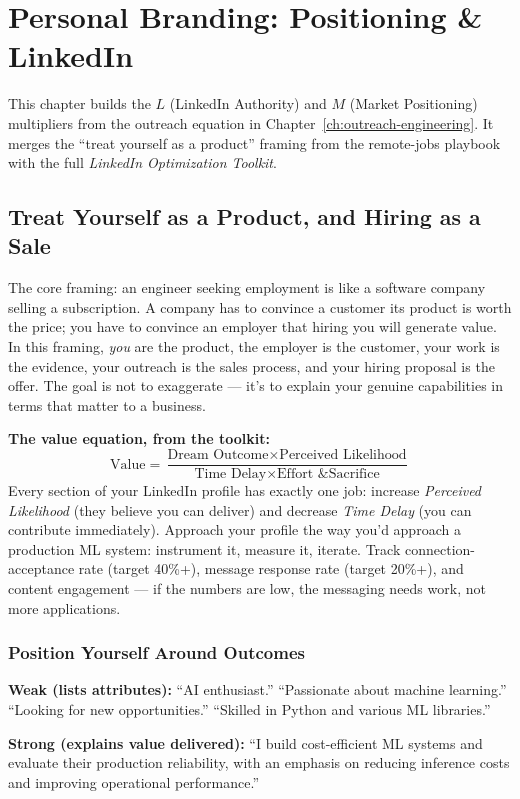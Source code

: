 \chapter{Personal Branding: Positioning \& LinkedIn}
\label{ch:linkedin}

This chapter builds the $L$ (LinkedIn Authority) and $M$ (Market Positioning) multipliers from the outreach
equation in Chapter~\ref{ch:outreach-engineering}. It merges the ``treat yourself as a product'' framing from the
remote-jobs playbook with the full \emph{LinkedIn Optimization Toolkit}.

\section{Treat Yourself as a Product, and Hiring as a Sale}

The core framing: an engineer seeking employment is like a software company selling a subscription. A company has
to convince a customer its product is worth the price; you have to convince an employer that hiring you will
generate value. In this framing, \emph{you} are the product, the employer is the customer, your work is the
evidence, your outreach is the sales process, and your hiring proposal is the offer. The goal is not to
exaggerate --- it's to explain your genuine capabilities in terms that matter to a business.

\begin{keytakeaway}
\textbf{The value equation, from the toolkit:}
$$\text{Value} = \frac{\text{Dream Outcome} \times \text{Perceived Likelihood}}{\text{Time Delay} \times
\text{Effort \& Sacrifice}}$$
Every section of your LinkedIn profile has exactly one job: increase \emph{Perceived Likelihood} (they believe you
can deliver) and decrease \emph{Time Delay} (you can contribute immediately). Approach your profile the way you'd
approach a production ML system: instrument it, measure it, iterate. Track connection-acceptance rate (target
40\%+), message response rate (target 20\%+), and content engagement --- if the numbers are low, the messaging
needs work, not more applications.
\end{keytakeaway}

\subsection{Position Yourself Around Outcomes}

\begin{example}
\bad \textbf{Weak (lists attributes):} ``AI enthusiast.'' ``Passionate about machine learning.'' ``Looking for new
opportunities.'' ``Skilled in Python and various ML libraries.''

\good \textbf{Strong (explains value delivered):} ``I build cost-efficient ML systems and evaluate their
production reliability, with an emphasis on reducing inference costs and improving operational performance.''
\end{example}

